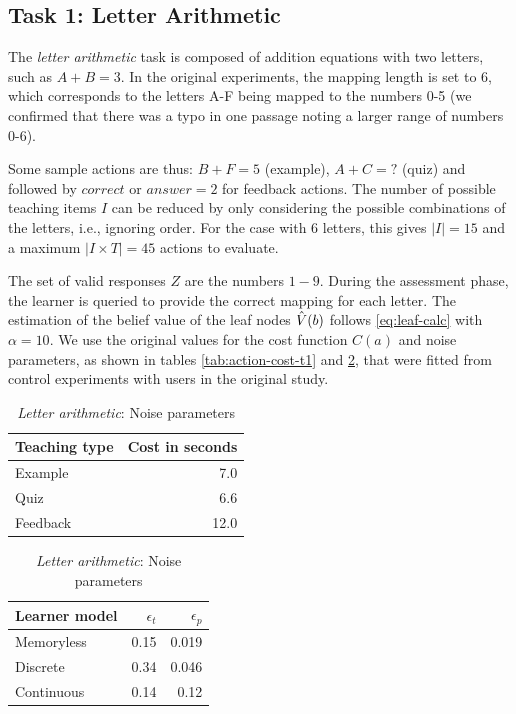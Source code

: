 \subsection{Task 1: Letter Arithmetic}

The \textit{letter arithmetic} task is composed of addition equations with two letters, such as $A+B=3$. In the original experiments, the mapping length is set to 6, which corresponds to the letters A-F being mapped to the numbers 0-5 (we confirmed that there was a typo in one passage noting a larger range of numbers 0-6).

Some sample actions are thus: $B+F=5$ (example), $A+C=?$ (quiz) and followed by $correct$ or $answer=2$ for feedback actions. 
The number of possible teaching items $I$ can be reduced by only considering the possible combinations of the letters, i.e., ignoring order. For the case with 6 letters, this gives $|I|=15$ and a maximum $|I \times T|=45$ actions to evaluate.

The set of valid responses $Z$ are the numbers $1-9$.
During the assessment phase, the learner is queried to provide the correct mapping for each letter.
The estimation of the belief value of the leaf nodes $\Hat{V}(b)$ follows \autoref{eq:leaf-calc} with $\alpha=10$.
We use the original values for the cost function $C(a)$ and noise parameters, as shown in tables \ref{tab:action-cost-t1} and \ref{tab:noise-t1}, that were fitted from control experiments with users in the original study.

\begin{table}
\small
\parbox[t]{.49\linewidth}{
    \centering
    \begin{tabular}[t]{l|r}
        \hline
        \textbf{Teaching type} & \textbf{Cost} in seconds \\
        \hline
        Example & 7.0 \\
        Quiz    & 6.6 \\
        Feedback & 12.0 \\
        \hline
    \end{tabular}
    \caption{\textit{Letter arithmetic}: Teaching activity costs}
    \label{tab:action-cost-t1}
}
\hfill
\parbox[t]{.49\linewidth}{
    \centering
    \begin{tabular}[t]{l|rr}
        \hline
        \textbf{Learner model} & $\epsilon_t$ & $\epsilon_p$ \\
        \hline
        Memoryless  & 0.15 & 0.019 \\
        Discrete    & 0.34 & 0.046 \\
        Continuous  & 0.14 & 0.12 \\
        \hline
    \end{tabular}
    \caption{\textit{Letter arithmetic}: Noise parameters}
    \label{tab:noise-t1}
}
\end{table}


